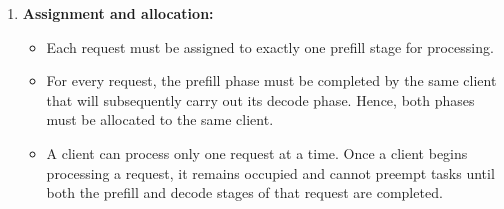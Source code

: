 \begin{enumerate}
\begin{itemize}
    \end{itemize}
    \item \textbf{Assignment and allocation:}
        \begin{itemize}
        \item Each request must be assigned to exactly one prefill stage for processing.
        \item For every request, the prefill phase must be completed by the same client that will subsequently carry out its decode phase. Hence, both phases must be allocated to the same client.
        \item  A client can process only one request at a time. Once a client begins processing a request, it remains occupied and cannot preempt tasks until both the prefill and decode stages of that request are completed.
    \end{itemize}
\end{enumerate}







